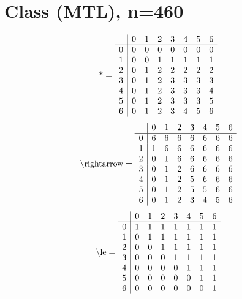 \documentclass[11pt]{article}
\begin{document}
\section{Class (MTL), n=460}
\[\text{*} = 
\begin{array}{r | r r r r r r r}
 & 0 & 1 & 2 & 3 & 4 & 5 & 6 \\ \hline
0 & 0 & 0 & 0 & 0 & 0 & 0 & 0 \\
1 & 0 & 0 & 1 & 1 & 1 & 1 & 1 \\
2 & 0 & 1 & 2 & 2 & 2 & 2 & 2 \\
3 & 0 & 1 & 2 & 3 & 3 & 3 & 3 \\
4 & 0 & 1 & 2 & 3 & 3 & 3 & 4 \\
5 & 0 & 1 & 2 & 3 & 3 & 3 & 5 \\
6 & 0 & 1 & 2 & 3 & 4 & 5 & 6 \\
\end{array}
\]
\[\text{\textbackslash rightarrow} = 
\begin{array}{r | r r r r r r r}
 & 0 & 1 & 2 & 3 & 4 & 5 & 6 \\ \hline
0 & 6 & 6 & 6 & 6 & 6 & 6 & 6 \\
1 & 1 & 6 & 6 & 6 & 6 & 6 & 6 \\
2 & 0 & 1 & 6 & 6 & 6 & 6 & 6 \\
3 & 0 & 1 & 2 & 6 & 6 & 6 & 6 \\
4 & 0 & 1 & 2 & 5 & 6 & 6 & 6 \\
5 & 0 & 1 & 2 & 5 & 5 & 6 & 6 \\
6 & 0 & 1 & 2 & 3 & 4 & 5 & 6 \\
\end{array}
\]
\[\text{\textbackslash le} = 
\begin{array}{r | r r r r r r r}
 & 0 & 1 & 2 & 3 & 4 & 5 & 6 \\ \hline
0 & 1 & 1 & 1 & 1 & 1 & 1 & 1 \\
1 & 0 & 1 & 1 & 1 & 1 & 1 & 1 \\
2 & 0 & 0 & 1 & 1 & 1 & 1 & 1 \\
3 & 0 & 0 & 0 & 1 & 1 & 1 & 1 \\
4 & 0 & 0 & 0 & 0 & 1 & 1 & 1 \\
5 & 0 & 0 & 0 & 0 & 0 & 1 & 1 \\
6 & 0 & 0 & 0 & 0 & 0 & 0 & 1 \\
\end{array}
\]
\end{document}
